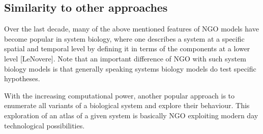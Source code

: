 \subsection{Similarity to other approaches}

Over the last decade, many of the above mentioned features of NGO models have become popular in system biology, where one describes a system at a specific spatial and temporal level by defining it in terms of the components at a lower level [LeNovere]. Note that an important difference of NGO with such system biology models is that generally speaking systems biology models do test specific hypotheses.

With the increasing computational power, another popular approach is to enumerate all variants of a biological system and explore their behaviour. This exploration of an atlas of a given system is basically NGO exploiting modern day technological possibilities.